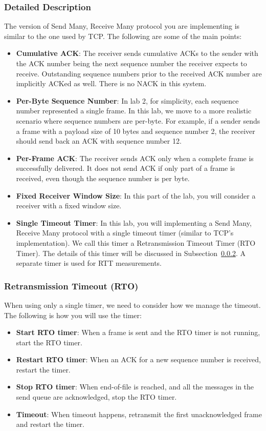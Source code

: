 \documentclass[11pt]{article}
\begin{document}
\subsubsection{Detailed Description}
The version of Send Many, Receive Many protocol you are implementing is similar to the one used by TCP. The following are some of the main points:
\begin{itemize}
    \item \textbf{Cumulative ACK}: The receiver sends cumulative ACKs to the sender with the ACK number being the next sequence number the receiver expects to receive. Outstanding sequence numbers prior to the received ACK number are implicitly ACKed as well. There is no NACK in this system.
    \item \textbf{Per-Byte Sequence Number}: In lab 2, for simplicity, each sequence number represented a single frame. In this lab, we move to a more realistic scenario where sequence numbers are per-byte. For example, if a sender sends a frame with a payload size of 10 bytes and sequence number 2, the receiver should send back an ACK with sequence number 12.
    \item \textbf{Per-Frame ACK}: The receiver sends ACK only when a complete frame is successfully delivered. It does not send ACK if only part of a frame is received, even though the sequence number is per byte.
    \item \textbf{Fixed Receiver Window Size}: In this part of the lab, you will consider a receiver with a fixed window size.
    \item \textbf{Single Timeout Timer}: In this lab, you will implementing a Send Many, Receive Many protocol with a single timeout timer (similar to TCP's implementation). We call this timer a Retransmission Timeout Timer (RTO Timer). The details of this timer will be discussed in Subsection~\ref{rto_timer}. A separate timer is used for RTT measurements.
\end{itemize}



\subsubsection{Retransmission Timeout (RTO)}
\label{rto_timer}
When using only a single timer, we need to consider how we manage the timeout. The following is how you will use the timer:

\begin{itemize}
    \item \textbf{Start RTO timer}: When a frame is sent and the RTO timer is not running, start the RTO timer.
    \item \textbf{Restart RTO timer}: When an ACK for a new sequence number is received, restart the timer.
    \item \textbf{Stop RTO timer}: When end-of-file is reached, and all the messages in the send queue are acknowledged, stop the RTO timer.
    \item \textbf{Timeout}: When timeout happens, retransmit the first unacknowledged frame and restart the timer.
\end{itemize}
\end{document}
